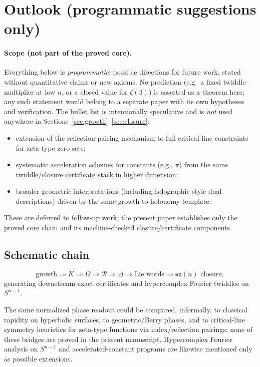 \documentclass[11pt]{amsart}
\begin{document}
\section{Outlook (programmatic suggestions only)}
\label{sec:outlook}
\paragraph{Scope (not part of the proved core).}
Everything below is \emph{programmatic}: possible directions for future work, stated without quantitative claims or new axioms. No prediction (e.g.\ a fixed twiddle multiplier at low \(n\), or a closed value for \(\zeta(3)\)) is asserted as a theorem here; any such statement would belong to a separate paper with its own hypotheses and verification.
The bullet list is intentionally speculative and is \emph{not} used anywhere in Sections~\ref{sec:growth}--\ref{sec:closure}:
\begin{itemize}
  \item extension of the reflection-pairing mechanism to full critical-line constraints for zeta-type zero sets;
  \item systematic acceleration schemes for constants (e.g., \(\pi\)) from the same twiddle/closure certificate stack in higher dimension;
  \item broader geometric interpretations (including holographic-style dual descriptions) driven by the same growth-to-holonomy template.
\end{itemize}
These are deferred to follow-up work; the present paper establishes only the proved core chain and its machine-checked closure/certificate components.

\subsection*{Schematic chain}
\[
\text{growth}\Longrightarrow K\Longrightarrow \Omega\Longrightarrow \mathcal R
\Longrightarrow \Delta\Longrightarrow \text{Lie words}\Longrightarrow \mathfrak{so}(n)\text{ closure},
\]
generating downstream exact certificates and hypercomplex Fourier twiddles on \(S^{n-1}\).

The same normalized phase readout could be compared, informally, to classical rapidity on hyperbolic surfaces, to geometric/Berry phases, and to critical-line symmetry heuristics for zeta-type functions via index/reflection pairings; none of these bridges are proved in the present manuscript. Hypercomplex Fourier analysis on \(S^{n-1}\) and accelerated-constant programs are likewise mentioned only as possible extensions.
\end{document}
